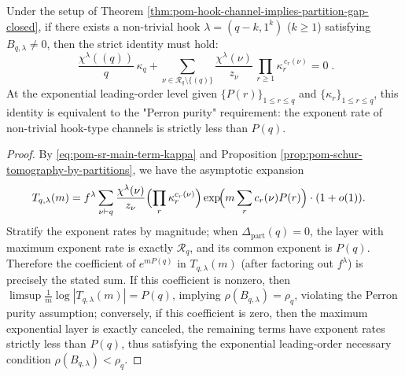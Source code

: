 \begin{theorem}\label{thm:pom-hook-channel-leading-term-cancellation}
Under the setup of Theorem \ref{thm:pom-hook-channel-implies-partition-gap-closed}, if there exists a non-trivial hook \(\lambda=(q-k,1^k)\) (\(k\ge 1\)) satisfying \(B_{q,\lambda}\neq 0\),
then the strict identity must hold:
\[
\boxed{\;
\frac{\chi^\lambda((q))}{q}\,\kappa_q
+\sum_{\nu\in\mathcal{R}_q\setminus\{(q)\}}
\frac{\chi^\lambda(\nu)}{z_\nu}\,
\prod_{r\ge 1}\kappa_r^{\,c_r(\nu)}
=0\; }.
\]
At the exponential leading-order level given \(\{P(r)\}_{1\le r\le q}\) and \(\{\kappa_r\}_{1\le r\le q}\), this identity is equivalent to the "Perron purity" requirement: the exponent rate of non-trivial hook-type channels is strictly less than \(P(q)\).
\end{theorem}
\begin{proof}
By \eqref{eq:pom-sr-main-term-kappa} and Proposition \ref{prop:pom-schur-tomography-by-partitions}, we have the asymptotic expansion
\[
\begin{aligned}
T_{q,\lambda}(m)
&=
f^\lambda\sum_{\nu\vdash q}\frac{\chi^\lambda(\nu)}{z_\nu}
\Bigl(\prod_r \kappa_r^{c_r(\nu)}\Bigr)
\exp\!\Bigl(m\sum_r c_r(\nu)P(r)\Bigr)\cdot(1+o(1)).
\end{aligned}
\]
Stratify the exponent rates by magnitude; when \(\Delta_{\mathrm{part}}(q)=0\), the layer with maximum exponent rate is exactly \(\mathcal{R}_q\), and its common exponent is \(P(q)\).
Therefore the coefficient of \(e^{mP(q)}\) in \(T_{q,\lambda}(m)\) (after factoring out \(f^\lambda\)) is precisely the stated sum.
If this coefficient is nonzero, then \(\limsup \frac1m\log|T_{q,\lambda}(m)|=P(q)\), implying \(\rho(B_{q,\lambda})=\rho_q\), violating the Perron purity assumption;
conversely, if this coefficient is zero, then the maximum exponential layer is exactly canceled, the remaining terms have exponent rates strictly less than \(P(q)\), thus satisfying the exponential leading-order necessary condition \(\rho(B_{q,\lambda})<\rho_q\).
\end{proof}

